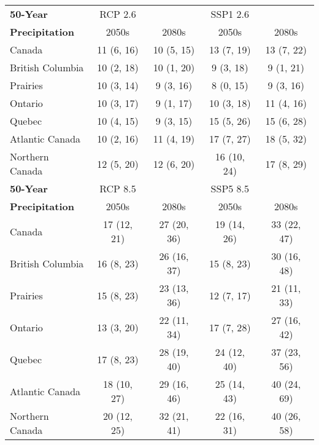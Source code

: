 \documentclass[]{scrartcl}
\begin{document}
\begin{appendices}
\begin{table}[t]
\begin{center}
\begin{tabularx}{\linewidth}{|L|cc|cc|}
			\textbf{50-Year} & RCP 2.6 & & SSP1 2.6 &   \\
			\textbf{Precipitation} & 2050s & 2080s & 2050s &2080s \\
			\hline
			Canada & 11 (6, 16) & 10 (5, 15) & 13 (7, 19) & 13 (7, 22) \\ 
			British Columbia & 10 (2, 18) & 10 (1, 20) & 9 (3, 18) & 9 (1, 21) \\ 
			Prairies & 10 (3, 14) & 9 (3, 16) & 8 (0, 15) & 9 (3, 16) \\ 
			Ontario & 10 (3, 17) & 9 (1, 17) & 10 (3, 18) & 11 (4, 16) \\ 
			Quebec & 10 (4, 15) & 9 (3, 15) & 15 (5, 26) & 15 (6, 28) \\ 
			Atlantic Canada & 10 (2, 16) & 11 (4, 19) & 17 (7, 27) & 18 (5, 32) \\ 
			Northern Canada & 12 (5, 20) & 12 (6, 20) & 16 (10, 24) & 17 (8, 29) \\ 
			\hline
			\textbf{50-Year} & RCP 8.5 & & SSP5 8.5 &   \\
			\textbf{Precipitation} & 2050s & 2080s & 2050s &2080s \\
			\hline
			Canada & 17 (12, 21) & 27 (20, 36) & 19 (14, 26) & 33 (22, 47) \\ 
			British Columbia & 16 (8, 23) & 26 (16, 37) & 15 (8, 23) & 30 (16, 48) \\ 
			Prairies & 15 (8, 23) & 23 (13, 36) & 12 (7, 17) & 21 (11, 33) \\ 
			Ontario & 13 (3, 20) & 22 (11, 34) & 17 (7, 28) & 27 (16, 42) \\ 
			Quebec & 17 (8, 23) & 28 (19, 40) & 24 (12, 40) & 37 (23, 56) \\ 
			Atlantic Canada & 18 (10, 27) & 29 (16, 46) & 25 (14, 43) & 40 (24, 69) \\ 
			Northern Canada & 20 (12, 25) & 32 (21, 41) & 22 (16, 31) & 40 (26, 58) \\ 
			\hline	
		\end{tabularx}
	\end{center}
\end{table}


\end{appendices}
\end{document}
